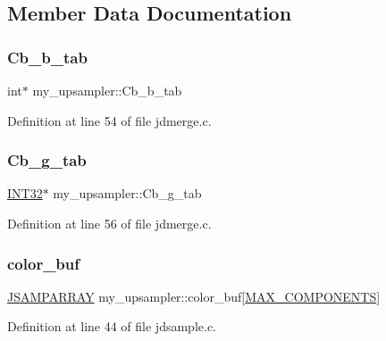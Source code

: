 \subsection{Member Data Documentation}
\mbox{\label{structmy__upsampler_a0e7a2bfa2d928b6643497e092ac68205}} 
\subsubsection{\texorpdfstring{Cb\_b\_tab}{Cb\_b\_tab}}
{\footnotesize\ttfamily int$\ast$ my\+\_\+upsampler\+::\+Cb\+\_\+b\+\_\+tab}



Definition at line 54 of file jdmerge.\+c.

\mbox{\label{structmy__upsampler_af9bf33b5de13df22004b7f0f99d8195d}} 
\subsubsection{\texorpdfstring{Cb\_g\_tab}{Cb\_g\_tab}}
{\footnotesize\ttfamily \mbox{\hyperlink{jmorecfg_8h_a0cb58e7e6f0bad369840a52e54a56ae0}{I\+N\+T32}}$\ast$ my\+\_\+upsampler\+::\+Cb\+\_\+g\+\_\+tab}



Definition at line 56 of file jdmerge.\+c.

\mbox{\label{structmy__upsampler_a72da5ad87430b974aeabce55c30eb653}} 
\subsubsection{\texorpdfstring{color\_buf}{color\_buf}}
{\footnotesize\ttfamily \mbox{\hyperlink{jpeglib_8h_ac9d5d1b829ed51769db69a37271a7e91}{J\+S\+A\+M\+P\+A\+R\+R\+AY}} my\+\_\+upsampler\+::color\+\_\+buf\mbox{[}\mbox{\hyperlink{jmorecfg_8h_a6d8c910a1fdb6d4762a05f7250e64322}{M\+A\+X\+\_\+\+C\+O\+M\+P\+O\+N\+E\+N\+TS}}\mbox{]}}



Definition at line 44 of file jdsample.\+c.

